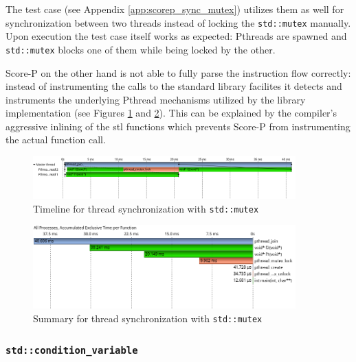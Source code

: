 The test case (see Appendix \ref{app:scorep_sync_mutex}) utilizes them as well for synchronization between two threads instead of locking the \texttt{std::mutex} manually. Upon execution the test case itself works as expected: Pthreads are spawned and \texttt{std::mutex} blocks one of them while being locked by the other.

Score-P on the other hand is not able to fully parse the instruction flow correctly: instead of instrumenting the calls to the standard library facilites it detects and instruments the underlying  Pthread mechanisms utilized by the library implementation (see Figures \ref{scorep:sync_pthread_mutex_timeline} and \ref{scorep:sync_pthread_mutex_summary}). This can be explained by the compiler's aggressive inlining of the \gls{stl} functions which prevents Score-P from instrumenting the actual function call.

\begin{figure}[htbp]
	\begin{center}
		\includegraphics[width=0.9\textwidth]{img/scorep_pthread_mutex_timeline.png}
		\caption{Timeline for thread synchronization with \texttt{std::mutex}}
		\label{scorep:sync_pthread_mutex_timeline}
	\end{center}
\end{figure}

\begin{figure}[htbp]
	\begin{center}
		\includegraphics[width=0.9\textwidth]{img/scorep_pthread_mutex_summary.png}
		\caption{Summary for thread synchronization with \texttt{std::mutex}}
		\label{scorep:sync_pthread_mutex_summary}
	\end{center}
\end{figure}

\subsubsection{\texttt{std::condition\_variable}}

